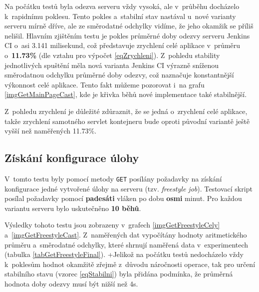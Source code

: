             \medskip
            Na počátku testů byla odezva serveru vždy vysoká, ale v~průběhu docházelo k~rapidnímu poklesu.
            Tento pokles a~stabilní stav nastával u~nové varianty serveru mírně dříve, ale ze
            směrodatné odchylky vidíme, že jeho okamžik se příliš nelišil. Hlavním
            zjištěním testu je pokles průměrné doby odezvy serveru Jenkins CI o~asi 3.141 milisekund,
            což představuje zrychlení celé aplikace v~průměru o~\textbf{11.73\%} (dle vztahu pro výpočet \ref{eqZrychleni}).
            Z~pohledu stability jednotlivých spuštění měla nová varianta Jenkins CI výrazně sníženou
            směrodatnou odchylku průměrné doby odezvy, což naznačuje konstantnější výkonnost celé aplikace.
            Tento fakt můžeme pozorovat i~na grafu \ref{imgGetMainPageCast}, kde je křivka běhů nové implementace
            také stabilnější.

            Z~pohledu zrychlení je důležité zdůraznit, že se jedná o~zrychlení celé aplikace, takže
            zrychlení samotného servlet kontejneru bude oproti původní variantě ještě vyšší než naměřených 11.73\%.
            




        \subsection{Získání konfigurace úlohy}
            V~tomto testu byly pomocí metody \texttt{GET} posílány požadavky na získání
            konfigurace jedné vytvořené úlohy na serveru (tzv. \emph{freestyle job}). 
            Testovací skript posílal požadavky pomocí \textbf{padesáti} vláken po dobu \textbf{osmi} minut.
            Pro každou variantu serveru bylo uskutečněno \textbf{10 běhů}. 

            Výsledky tohoto testu jsou zobrazeny v~grafech \ref{imgGetFreestyleCely} a~\ref{imgGetFreestyleCast}.
            Z~naměřených dat vypočítány hodnoty aritmetického průměru a~směrodatné odchylky,
            které shrnují naměřená data v~experimentech (tabulka \ref{tabGetFreestyleFinal}).
            +Jelikož na
            počátku testů nedocházelo vždy k~poklesům hodnot okamžitě zřejmě z~důvodu
            náročnosti operace, tak pro určení stabilního stavu (vzorec \ref{eqStabilni}) byla přidána
            podmínka, že průměrná hodnota doby odezvy musí být nižší než 4s.


